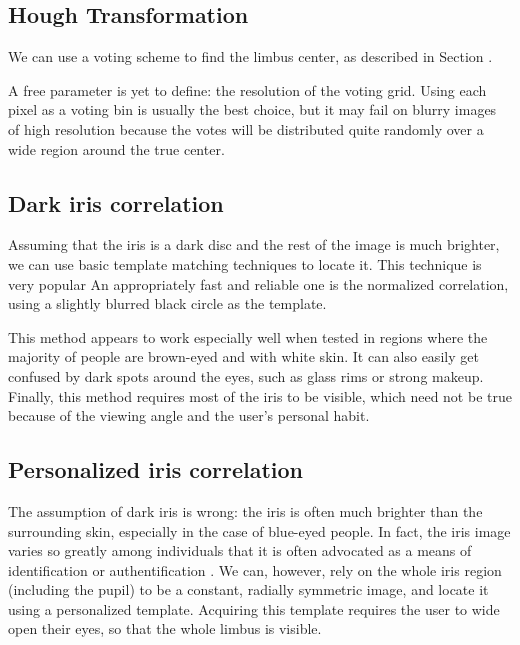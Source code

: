 \subsection{Hough Transformation}
We can use a voting scheme to find the limbus center, as described in Section .
\cite{leo14,zhang13}

A free parameter is yet to define: the resolution of the voting grid.
Using each pixel as a voting bin is usually the best choice, but it may fail on blurry images of high resolution because the votes will be distributed quite randomly over a wide region around the true center.


\subsection{Dark iris correlation}

Assuming that the iris is a dark disc and the rest of the image is much brighter, we can use basic template matching techniques to locate it.
This technique is very popular \cite{zhu12,george16}
An appropriately fast and reliable one is the normalized correlation, using a slightly blurred black circle as the template.


This method appears to work especially well when tested in regions where the majority of people are brown-eyed and with white skin.
It can also easily get confused by dark spots around the eyes, such as glass rims or strong makeup.
Finally, this method requires most of the iris to be visible, which need not be true because of the viewing angle and the user's personal habit.

\subsection{Personalized iris correlation}
The assumption of dark iris is wrong: the iris is often much brighter than the surrounding skin, especially in the case of blue-eyed people.
In fact, the iris image varies so greatly among individuals that it is often advocated as a means of identification or authentification \cite{bowyer16}.
We can, however, rely on the whole iris region (including the pupil) to be a constant, radially symmetric image, and locate it using a personalized template.
Acquiring this template requires the user to wide open their eyes, so that the whole limbus is visible.

